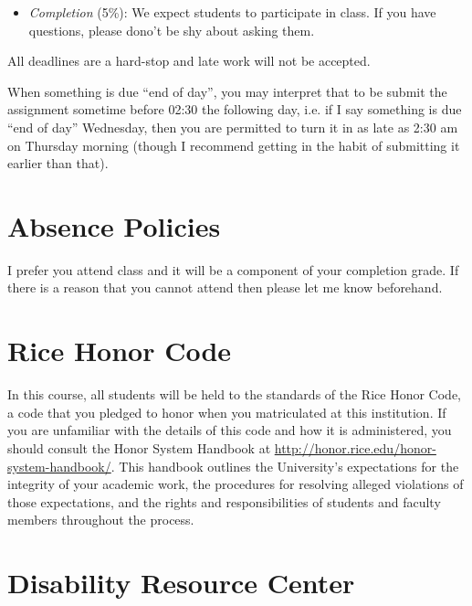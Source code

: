 \documentclass[11pt]{article}
\begin{document}
\begin{flushleft}
\begin{itemize}
            \item \textit{Completion} (5\%): We expect students to participate
                in class. If you have questions, please dono't be shy about
                asking them.
        \end{itemize}

        All deadlines are a hard-stop and late work will not be accepted.

        When something is due ``end of day'', you may interpret that to be
        submit the assignment sometime before 02:30 the following day, i.e. if I
        say something is due ``end of day'' Wednesday, then you are permitted to turn
        it in as late as 2:30 am on Thursday morning (though I recommend getting
        in the habit of submitting it earlier than that).

        \section{Absence Policies}
        \label{absence-policies}

        I prefer you attend class and it will be a component of your completion
        grade. If there is a reason that you cannot attend then please let me know
        beforehand.

        \section{Rice Honor Code}
        \label{rice-honor-code}

        In this course, all students will be held to the standards of the Rice Honor
        Code, a code that you pledged to honor when you matriculated at this
        institution. If you are unfamiliar with the details of this code and how it
        is administered, you should consult the Honor System Handbook at
        \url{http://honor.rice.edu/honor-system-handbook/}. This handbook outlines
        the University's expectations for the integrity of your academic work,
        the procedures for resolving alleged violations of those expectations, and
        the rights and responsibilities of students and faculty members throughout
        the process.

        \section{Disability Resource Center}
        \label{disability-resource-center}


\end{flushleft}
\end{document}
